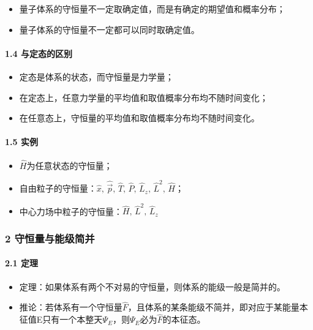 \documentclass[UTF8,twocolumn]{ctexart}
\providecommand{\tightlist}{%
  \setlength{\itemsep}{0pt}\setlength{\parskip}{0pt}}
\let\oldparagraph\paragraph
\renewcommand{\paragraph}[1]{\oldparagraph{#1}\mbox{}}
\begin{document}
\begin{itemize}
\tightlist
\item
  量子体系的守恒量不一定取确定值，而是有确定的期望值和概率分布；
\item
  量子体系的守恒量不一定都可以同时取确定值。
\end{itemize}

\hypertarget{ux4e0eux5b9aux6001ux7684ux533aux522b}{%
\paragraph{ 1.4
与定态的区别}\label{ux4e0eux5b9aux6001ux7684ux533aux522b}}

\begin{itemize}
\tightlist
\item
  定态是体系的状态，而守恒量是力学量；
\item
  在定态上，任意力学量的平均值和取值概率分布均不随时间变化；
\item
  在任意态上，守恒量的平均值和取值概率分布均不随时间变化。
\end{itemize}

\hypertarget{ux5b9eux4f8b-1}{%
\paragraph{ 1.5 实例}\label{ux5b9eux4f8b-1}}

\begin{itemize}
\tightlist
\item
  \(\hat{H}\)为任意状态的守恒量；
\item
  自由粒子的守恒量：\(\hat{x},\,\hat{\vec{p}},\,\hat{T},\,\hat{P},\,\hat{L}_z,\,\hat{L}^2,\,\hat{H}\)；
\item
  中心力场中粒子的守恒量：\(\hat{H},\,\hat{L}^2,\,\hat{L}_z\)
\end{itemize}

\hypertarget{ux5b88ux6052ux91cfux4e0eux80fdux7ea7ux7b80ux5e76}{%
\subsubsection{2
守恒量与能级简并}\label{ux5b88ux6052ux91cfux4e0eux80fdux7ea7ux7b80ux5e76}}

\hypertarget{ux5b9aux7406-1}{%
\paragraph{ 2.1 定理}\label{ux5b9aux7406-1}}

\begin{itemize}
\tightlist
\item
  定理：如果体系有两个不对易的守恒量，则体系的能级一般是简并的。
\item
  推论：若体系有一个守恒量\(\hat{F}\)，且体系的某条能级不简并，即对应于某能量本征值E只有一个本整天\(\Psi_E\)，则\(\Psi_E\)必为\(\hat{F}\)的本征态。
\end{itemize}
\end{document}
